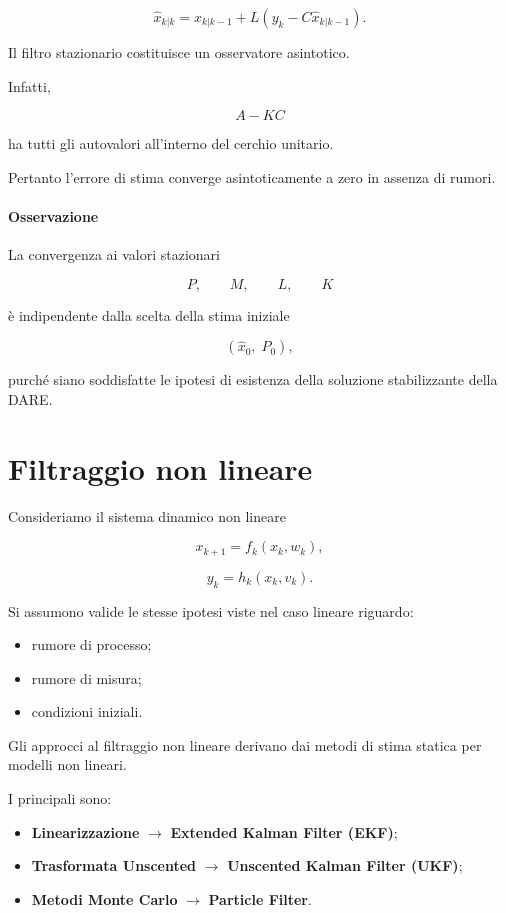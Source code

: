 \documentclass[11pt,a4paper]{article}
\begin{document}
\[
\boxed{
\hat{x}_{k|k}
=
\hat{x}_{k|k-1}
+
L
\left(
y_k-C\hat{x}_{k|k-1}
\right).
}
\]

Il filtro stazionario costituisce un osservatore asintotico.

Infatti,

\[
\boxed{
A-KC
}
\]

ha tutti gli autovalori all'interno del cerchio unitario.

Pertanto l'errore di stima converge asintoticamente a zero in assenza di rumori.

\paragraph{Osservazione}

La convergenza ai valori stazionari

\[
P,\qquad M,\qquad L,\qquad K
\]

è indipendente dalla scelta della stima iniziale

\[
\boxed{
(\hat{x}_0,\;P_0),
}
\]

purché siano soddisfatte le ipotesi di esistenza della soluzione stabilizzante della DARE.


\section{Filtraggio non lineare}

Consideriamo il sistema dinamico non lineare

\[
x_{k+1}=f_k(x_k,w_k),
\]

\[
y_k=h_k(x_k,v_k).
\]

Si assumono valide le stesse ipotesi viste nel caso lineare riguardo:

\begin{itemize}
    \item rumore di processo;
    \item rumore di misura;
    \item condizioni iniziali.
\end{itemize}

Gli approcci al filtraggio non lineare derivano dai metodi di stima statica per modelli non lineari.

I principali sono:

\begin{itemize}
    \item \textbf{Linearizzazione} \(\rightarrow\) \textbf{Extended Kalman Filter (EKF)};
    \item \textbf{Trasformata Unscented} \(\rightarrow\) \textbf{Unscented Kalman Filter (UKF)};
    \item \textbf{Metodi Monte Carlo} \(\rightarrow\) \textbf{Particle Filter}.
\end{itemize}
\end{document}
